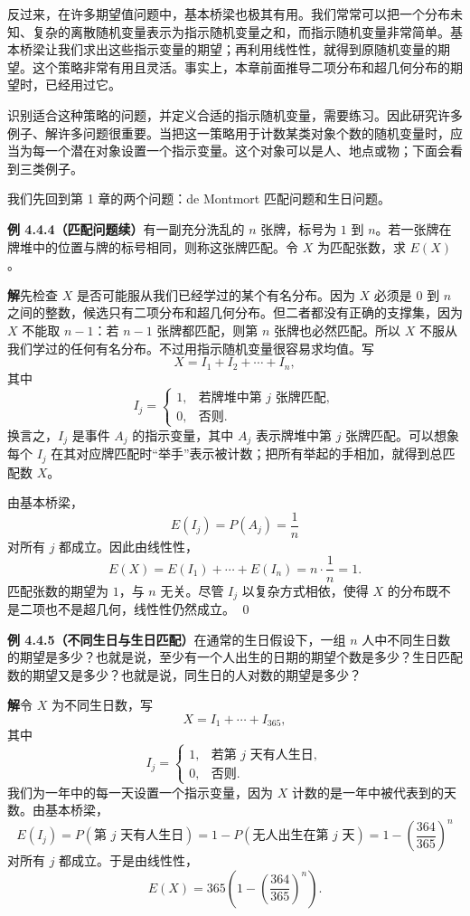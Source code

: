 \documentclass[UTF8,12pt,a4paper,fontset=fandol]{ctexart}
\begin{document}
反过来，在许多期望值问题中，基本桥梁也极其有用。我们常常可以把一个分布未知、复杂的离散随机变量表示为指示随机变量之和，而指示随机变量非常简单。基本桥梁让我们求出这些指示变量的期望；再利用线性性，就得到原随机变量的期望。这个策略非常有用且灵活。事实上，本章前面推导二项分布和超几何分布的期望时，已经用过它。

识别适合这种策略的问题，并定义合适的指示随机变量，需要练习。因此研究许多例子、解许多问题很重要。当把这一策略用于计数某类对象个数的随机变量时，应当为每一个潜在对象设置一个指示变量。这个对象可以是人、地点或物；下面会看到三类例子。

我们先回到第 1 章的两个问题：de Montmort 匹配问题和生日问题。

\noindent\textbf{例 4.4.4（匹配问题续）}\quad 有一副充分洗乱的 $n$ 张牌，标号为 $1$ 到 $n$。若一张牌在牌堆中的位置与牌的标号相同，则称这张牌匹配。令 $X$ 为匹配张数，求 $E(X)$。

\noindent\textbf{解}\quad 先检查 $X$ 是否可能服从我们已经学过的某个有名分布。因为 $X$ 必须是 $0$ 到 $n$ 之间的整数，候选只有二项分布和超几何分布。但二者都没有正确的支撑集，因为 $X$ 不能取 $n-1$：若 $n-1$ 张牌都匹配，则第 $n$ 张牌也必然匹配。所以 $X$ 不服从我们学过的任何有名分布。不过用指示随机变量很容易求均值。写
\[
  X=I_1+I_2+\cdots+I_n,
\]
其中
\[
  I_j=
  \begin{cases}
    1, & \text{若牌堆中第 }j\text{ 张牌匹配},\\
    0, & \text{否则}.
  \end{cases}
\]
换言之，$I_j$ 是事件 $A_j$ 的指示变量，其中 $A_j$ 表示牌堆中第 $j$ 张牌匹配。可以想象每个 $I_j$ 在其对应牌匹配时“举手”表示被计数；把所有举起的手相加，就得到总匹配数 $X$。

由基本桥梁，
\[
  E(I_j)=P(A_j)=\frac{1}{n}
\]
对所有 $j$ 都成立。因此由线性性，
\[
  E(X)=E(I_1)+\cdots+E(I_n)=n\cdot\frac{1}{n}=1.
\]
匹配张数的期望为 $1$，与 $n$ 无关。尽管 $I_j$ 以复杂方式相依，使得 $X$ 的分布既不是二项也不是超几何，线性性仍然成立。 \qed

\noindent\textbf{例 4.4.5（不同生日与生日匹配）}\quad 在通常的生日假设下，一组 $n$ 人中不同生日数的期望是多少？也就是说，至少有一个人出生的日期的期望个数是多少？生日匹配数的期望又是多少？也就是说，同生日的人对数的期望是多少？

\noindent\textbf{解}\quad 令 $X$ 为不同生日数，写
\[
  X=I_1+\cdots+I_{365},
\]
其中
\[
  I_j=
  \begin{cases}
    1, & \text{若第 }j\text{ 天有人生日},\\
    0, & \text{否则}.
  \end{cases}
\]
我们为一年中的每一天设置一个指示变量，因为 $X$ 计数的是一年中被代表到的天数。由基本桥梁，
\[
  E(I_j)=P(\text{第 }j\text{ 天有人生日})
  =1-P(\text{无人出生在第 }j\text{ 天})
  =1-\left(\frac{364}{365}\right)^n
\]
对所有 $j$ 都成立。于是由线性性，
\[
  E(X)=365\left(1-\left(\frac{364}{365}\right)^n\right).
\]
\end{document}
